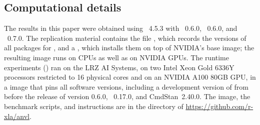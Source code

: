 \documentclass[article,shortnames]{jss}
\begin{document}
\begin{appendix}
\section{Computational details}\label{appendix-details}

The results in this paper were obtained using ~4.5.3 \citep{ref-r} with ~0.6.0, ~0.6.0, and ~0.7.0.
The replication material contains the file , which records the versions of all  packages for  \citep{ref-renv}, and a , which installs them on top of NVIDIA's  base image; the resulting  image runs on CPUs as well as on NVIDIA GPUs.
The runtime experiments () ran on the LRZ AI Systems, on two Intel Xeon Gold 6336Y processors restricted to 16 physical cores and on an NVIDIA A100 80GB GPU, in a  image that pins all software versions, including a development version of  from before the release of version 0.6.0, ~0.17.0, and CmdStan~2.40.0.
The image, the benchmark scripts, and instructions are in the  directory of \url{https://github.com/r-xla/anvl}.

\end{appendix}
\end{document}
